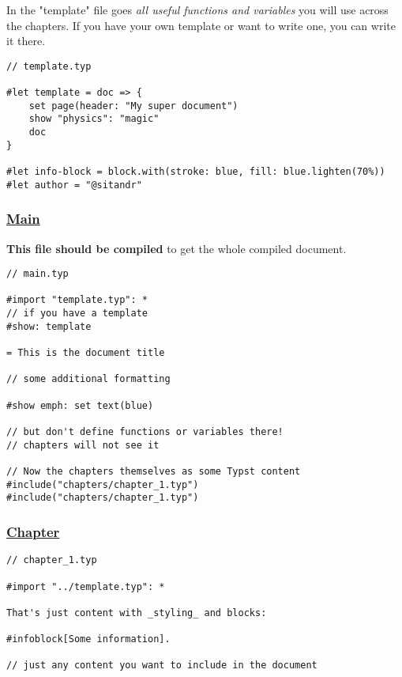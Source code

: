 In the "template" file goes \emph{all useful functions and variables}
you will use across the chapters. If you have your own template or want
to write one, you can write it there.

\begin{verbatim}
// template.typ

#let template = doc => {
    set page(header: "My super document")
    show "physics": "magic"
    doc
}

#let info-block = block.with(stroke: blue, fill: blue.lighten(70%))
#let author = "@sitandr"
\end{verbatim}

\subsubsection{\texorpdfstring{\hyperref[main]{Main}}{Main}}\label{main}

\textbf{This file should be compiled} to get the whole compiled
document.

\begin{verbatim}
// main.typ

#import "template.typ": *
// if you have a template
#show: template

= This is the document title

// some additional formatting

#show emph: set text(blue)

// but don't define functions or variables there!
// chapters will not see it

// Now the chapters themselves as some Typst content
#include("chapters/chapter_1.typ")
#include("chapters/chapter_1.typ")
\end{verbatim}

\subsubsection{\texorpdfstring{\hyperref[chapter]{Chapter}}{Chapter}}\label{chapter}

\begin{verbatim}
// chapter_1.typ

#import "../template.typ": *

That's just content with _styling_ and blocks:

#infoblock[Some information].

// just any content you want to include in the document
\end{verbatim}

